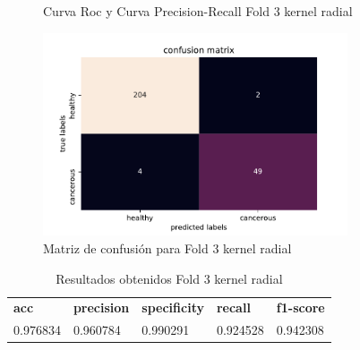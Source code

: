 \begin{figure}[H]
	\centering
	\caption{Curva Roc y Curva Precision-Recall Fold 3 kernel radial}
	\label{fig:resultados3}
\end{figure}

\begin{figure}[H]
	\centering
	\includegraphics[width=90mm]{imagenes/confusion_mat3_gpflow}
	\caption{Matriz de confusión para Fold 3 kernel radial}
	\label{fig:conf3}
\end{figure}

\begin{table}[H]
	\centering
	\begin{tabular}{lllll}
		\textbf{acc} & \textbf{precision} & \textbf{specificity} & \textbf{recall} & \textbf{f1-score} \\
		0.976834     & 0.960784           & 0.990291             & 0.924528        & 0.942308         \\
	\end{tabular}
	\caption{Resultados obtenidos Fold 3 kernel radial}
	\label{table:3}
\end{table}

